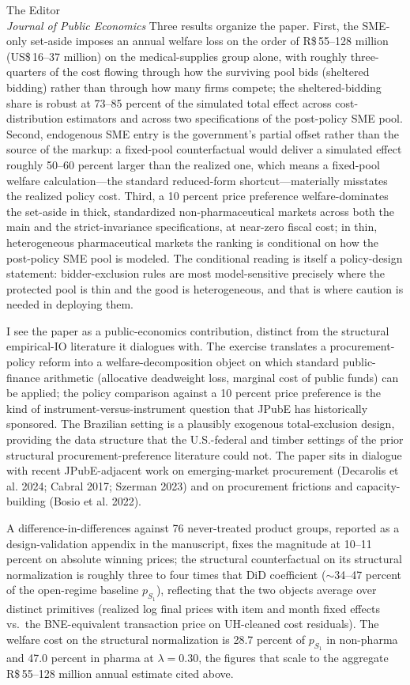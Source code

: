 \documentclass[11pt]{letter}
\begin{document}
\begin{letter}{The Editor\\\emph{Journal of Public Economics}}
Three results organize the paper. First, the SME-only set-aside imposes an annual welfare loss on the order of R\$\,55--128 million (US\$\,16--37 million) on the medical-supplies group alone, with roughly three-quarters of the cost flowing through how the surviving pool bids (sheltered bidding) rather than through how many firms compete; the sheltered-bidding share is robust at 73--85 percent of the simulated total effect across cost-distribution estimators and across two specifications of the post-policy SME pool. Second, endogenous SME entry is the government's partial offset rather than the source of the markup: a fixed-pool counterfactual would deliver a simulated effect roughly 50--60 percent larger than the realized one, which means a fixed-pool welfare calculation---the standard reduced-form shortcut---materially misstates the realized policy cost. Third, a 10 percent price preference welfare-dominates the set-aside in thick, standardized non-pharmaceutical markets across both the main and the strict-invariance specifications, at near-zero fiscal cost; in thin, heterogeneous pharmaceutical markets the ranking is conditional on how the post-policy SME pool is modeled. The conditional reading is itself a policy-design statement: bidder-exclusion rules are most model-sensitive precisely where the protected pool is thin and the good is heterogeneous, and that is where caution is needed in deploying them.

I see the paper as a public-economics contribution, distinct from the structural empirical-IO literature it dialogues with. The exercise translates a procurement-policy reform into a welfare-decomposition object on which standard public-finance arithmetic (allocative deadweight loss, marginal cost of public funds) can be applied; the policy comparison against a 10 percent price preference is the kind of instrument-versus-instrument question that JPubE has historically sponsored. The Brazilian setting is a plausibly exogenous total-exclusion design, providing the data structure that the U.S.-federal and timber settings of the prior structural procurement-preference literature could not. The paper sits in dialogue with recent JPubE-adjacent work on emerging-market procurement (Decarolis et al. 2024; Cabral 2017; Szerman 2023) and on procurement frictions and capacity-building (Bosio et al. 2022).

A difference-in-differences against 76 never-treated product groups, reported as a design-validation appendix in the manuscript, fixes the magnitude at 10--11 percent on absolute winning prices; the structural counterfactual on its structural normalization is roughly three to four times that DiD coefficient ($\sim$34--47 percent of the open-regime baseline $p_{S_1}$), reflecting that the two objects average over distinct primitives (realized log final prices with item and month fixed effects vs.\ the BNE-equivalent transaction price on UH-cleaned cost residuals). The welfare cost on the structural normalization is 28.7 percent of $p_{S_1}$ in non-pharma and 47.0 percent in pharma at $\lambda = 0.30$, the figures that scale to the aggregate R\$\,55--128 million annual estimate cited above.


\end{letter}
\end{document}

